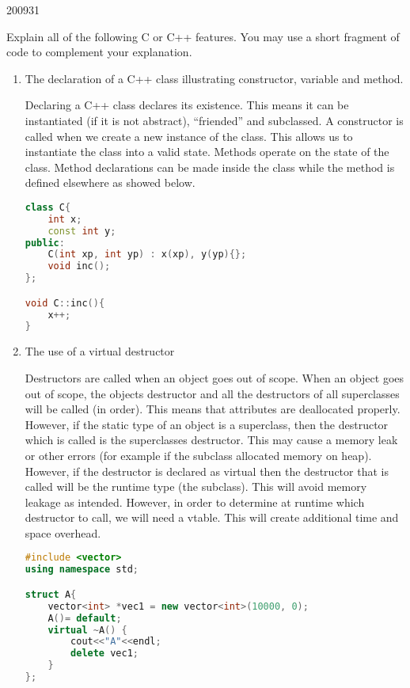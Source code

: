\documentclass[10pt,\jkfside,a4paper]{article}
\begin{document}
\begin{examquestion}{2009}{3}{1}

Explain all of the following C or C++ features. You may use a short
fragment of code to complement your explanation.

\begin{enumerate}[label=(\alph*)]

\item The declaration of a C++ class illustrating constructor, variable and
method.

Declaring a C++ class declares its existence. This means it can be
instantiated (if it is not abstract), ``friended'' and subclassed. A
constructor is called when we create a new instance of the class. This
allows us to instantiate the class into a valid state. Methods operate on
the state of the class. Method declarations can be made inside the class
while the method is defined elsewhere as showed below.

\begin{lstlisting}[language=C++]
class C{
	int x;
	const int y;
public:
	C(int xp, int yp) : x(xp), y(yp){};
	void inc();
};

void C::inc(){
	x++;
}
\end{lstlisting}

\item The use of a virtual destructor

Destructors are called when an object goes out of scope. When an object goes
out of scope, the objects destructor and all the destructors of all
superclasses will be called (in order). This means that attributes are
deallocated properly. However, if the static type of an object is a
superclass, then the destructor which is called is the superclasses
destructor. This may cause a memory leak or other errors (for example if
the subclass allocated memory on heap). However, if the destructor is
declared as virtual then the destructor that is called will be the runtime
type (the subclass). This will avoid memory leakage as intended. However, in
order to determine at runtime which destructor to call, we will need a
vtable. This will create additional time and space overhead.

\begin{lstlisting}[language=C++]
#include <vector>
using namespace std;

struct A{
    vector<int> *vec1 = new vector<int>(10000, 0);
    A()= default;
    virtual ~A() {
        cout<<"A"<<endl;
        delete vec1;
    }
};


\end{lstlisting}
\end{enumerate}
\end{examquestion}
\end{document}
